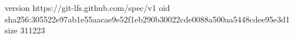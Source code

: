version https://git-lfs.github.com/spec/v1
oid sha256:305522e97ab1e55aacae9e52f1eb290b30022cde0088a500aa5448cdee95e3d1
size 311223
